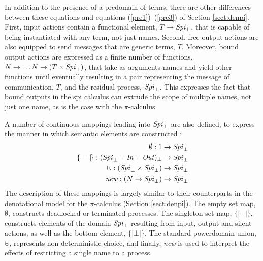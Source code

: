 \documentclass[10pt,a4paper,final,oneside,fleqn]{book}
\begin{document}
In addition to the presence of a predomain of terms, there are other differences between these equations and equations (\ref{pre1})--(\ref{pre3}) of Section \ref{sect:denpi}.  First, input actions contain a functional element, $T\to\mbox{{\itshape Spi}}_\bot$, that is capable of being instantiated with any term, not just names. Second, free output actions are also equipped to send messages that are generic terms, $T$.  Moreover, bound output actions are expressed as a finite number of functions, $N\to\ldots N\to(T\times\mbox{{\itshape Spi\/}}_\bot)$, that take as arguments names and yield other functions until eventually resulting in a pair representing the message of communication, $T$, and the residual process, $\mbox{{\itshape Spi\/}}_\bot$.  This expresses the fact that bound outputs in the spi calculus can extrude the scope of multiple names, not just one name, as is the case with the $\pi$-calculus.

A number of continuous mappings leading into $\mbox{{\itshape Spi\/}}_\bot$ are also defined, to express the manner in which semantic elements are constructed \cite[Def. 3.3]{abramsky1}:
\begin{eqnarray}
\emptyset:1\to\mbox{{\itshape Spi\/}}_\bot\label{prespi9}\\
\{\!|-|\!\}:(\mbox{{\itshape Spi\/}}_\bot+\mbox{{\itshape In\/}}+\mbox{{\itshape Out\/}})_\bot\to\mbox{{\itshape Spi\/}}_\bot\label{prespi10}\\
\uplus:(\mbox{{\itshape Spi\/}}_\bot\times\mbox{{\itshape  Spi\/}}_\bot)\to\mbox{{\itshape Spi\/}}_\bot\label{prespi11}\\
\mbox{{\itshape new\/}}:(N\to\mbox{{\itshape Spi\/}}_\bot)\to\mbox{{\itshape Spi\/}}_\bot\label{prespi12}
\end{eqnarray}
The description of these mappings is largely similar to their counterparts in the denotational model for the $\pi$-calculus (Section \ref{sect:denpi}).  The empty set map, $\emptyset$, constructs deadlocked or terminated processes.  The singleton set map, $\{\!|-|\!\}$, constructs elements of the domain $\mbox{{\itshape Spi}}_\bot$ resulting from input, output and silent actions, as well as the bottom element, $\{\!|\bot|\!\}$.  The standard powerdomain union, $\uplus$, represents non-deterministic choice, and finally, {\itshape new\/} is used to interpret the effects of restricting a single name to a process.
\end{document}
